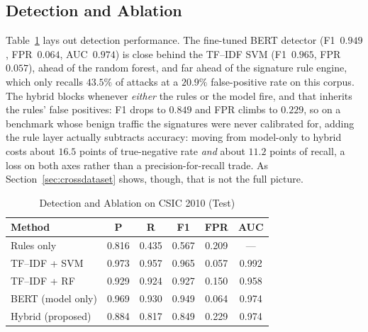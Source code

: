 \documentclass[conference]{IEEEtran}
\begin{document}
\subsection{Detection and Ablation}
Table~\ref{tab:main} lays out detection
performance. The fine-tuned BERT detector (F1~$0.949$, FPR~$0.064$,
AUC~$0.974$) is close behind the TF--IDF SVM (F1~$0.965$, FPR~$0.057$),
ahead of the random forest, and far ahead of the
signature rule engine, which only recalls $43.5\%$ of attacks at a
$20.9\%$ false-positive rate on this corpus. The hybrid blocks whenever
\emph{either} the rules or the model fire, and that inherits the rules'
false positives: F1 drops to $0.849$ and FPR climbs to $0.229$, so on a
benchmark whose benign traffic the signatures were never calibrated for,
adding the rule layer actually subtracts accuracy: moving from model-only
to hybrid costs about $16.5$ points of true-negative rate \emph{and}
about $11.2$ points of recall, a loss on both axes rather than a
precision-for-recall trade. As Section~\ref{sec:crossdataset} shows,
though, that is not the full picture.

\begin{table}[t]
\centering
\caption{Detection and Ablation on CSIC 2010 (Test)}
\label{tab:main}
\begin{tabular}{@{}lccccc@{}}
\toprule
Method & P & R & F1 & FPR & AUC \\
\midrule
Rules only            & 0.816 & 0.435 & 0.567 & 0.209 & --- \\
TF--IDF + SVM         & 0.973 & 0.957 & 0.965 & 0.057 & 0.992 \\
TF--IDF + RF          & 0.929 & 0.924 & 0.927 & 0.150 & 0.958 \\
BERT (model only)     & 0.969 & 0.930 & 0.949 & 0.064 & 0.974 \\
Hybrid (proposed)         & 0.884 & 0.817 & 0.849 & 0.229 & 0.974 \\
\bottomrule
\end{tabular}
\end{table}
\end{document}
